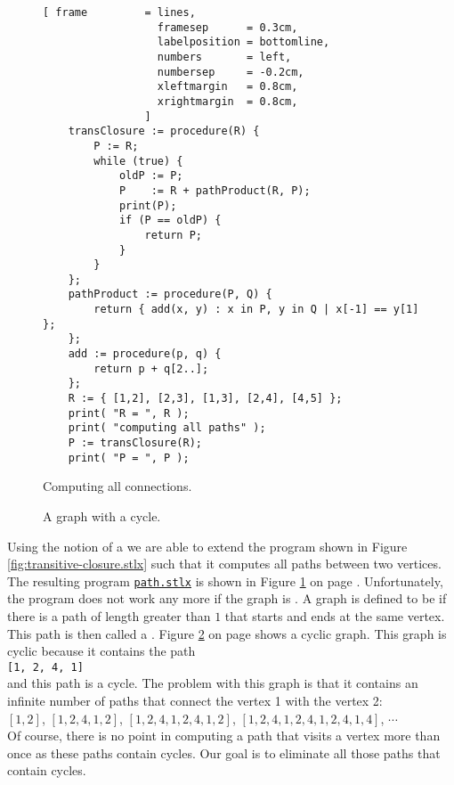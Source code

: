 \begin{figure}[!ht]
  \centering
\begin{Verbatim}[ frame         = lines, 
                  framesep      = 0.3cm, 
                  labelposition = bottomline,
                  numbers       = left,
                  numbersep     = -0.2cm,
                  xleftmargin   = 0.8cm,
                  xrightmargin  = 0.8cm,
                ]
    transClosure := procedure(R) {
        P := R;
        while (true) {
            oldP := P;
            P    := R + pathProduct(R, P);
            print(P);
            if (P == oldP) {
                return P;
            }
        }
    };
    pathProduct := procedure(P, Q) {
        return { add(x, y) : x in P, y in Q | x[-1] == y[1] };
    };    
    add := procedure(p, q) {
        return p + q[2..];
    };
    R := { [1,2], [2,3], [1,3], [2,4], [4,5] };
    print( "R = ", R );
    print( "computing all paths" );
    P := transClosure(R);
    print( "P = ", P );
\end{Verbatim} 
\vspace*{-0.3cm}
\caption{Computing all connections.}  \label{fig:path.stlx}
\end{figure} %

\begin{figure}[!ht]
  \centering
  \vspace*{-9cm}

  \vspace*{-1cm}

  \caption{A graph with a cycle.}
  \label{fig:graph-zykl}
\end{figure}

Using the notion of a  we are able to extend the program shown in Figure
\ref{fig:transitive-closure.stlx} such that it computes all paths between two vertices.
The resulting program
\href{https://github.com/karlstroetmann/Logik/blob/master/SetlX/path.stlx}{\texttt{path.stlx}}
is shown in Figure \ref{fig:path.stlx} on page \pageref{fig:path.stlx}.
Unfortunately, the program does not work any more if the graph is .  A graph is defined
to be  if there is a path of length greater than $1$ that starts and ends at the same
vertex.  This path is then called a \colorbox{amethyst}{}.
Figure \ref{fig:graph-zykl} on page \pageref{fig:graph-zykl} shows a cyclic graph.  This graph is
cyclic because it contains the path
\\[0.2cm]
\hspace*{1.3cm}
\texttt{[1, 2, 4, 1]}
\\[0.2cm]
and this path is a cycle.
The problem with this graph is that it contains an infinite number of paths that connect the vertex
1 with the vertex 2: \\[0.2cm]
\hspace*{1.3cm}
$[ 1, 2 ]$, $[ 1, 2, 4, 1, 2 ]$, 
$[ 1, 2, 4, 1, 2, 4, 1, 2 ]$, 
$[ 1, 2, 4, 1, 2, 4, 1, 2, 4, 1, 4 ]$, $\cdots$
\\[0.2cm]
Of course, there is no point in computing a path that visits a vertex more than once as these paths
contain cycles.  Our goal is to eliminate all those paths that contain cycles.



